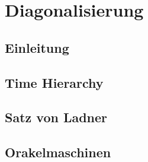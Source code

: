 \section{Diagonalisierung}
\subsection[Einleitung]{Einleitung}

\subsection[Time Hierarchy]{Time Hierarchy}

\subsection[Satz von Ladner]{Satz von Ladner}

\subsection[Orakelmaschinen]{Orakelmaschinen}
